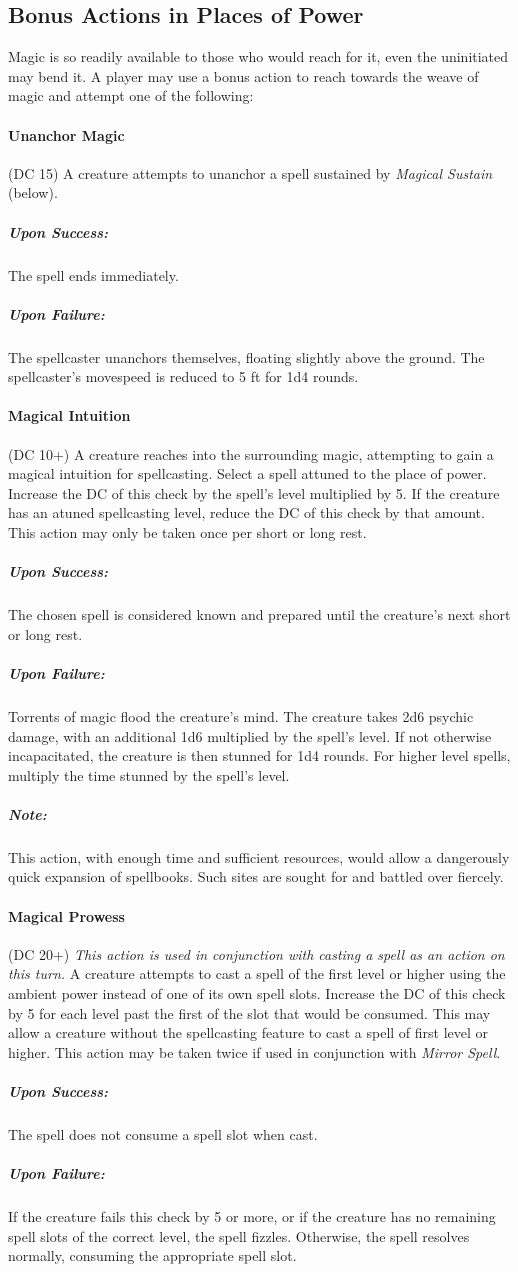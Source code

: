 \documentclass{article}
\newcommand{\action}[2]{\paragraph*{{\color{tan}#1}} (DC #2)\newline}
\newcommand{\success}{\subparagraph*{{\color{tan}Upon Success:}}}
\newcommand{\failure}{\subparagraph*{{\color{tan}Upon Failure:}}}
\newcommand{\note}{\subparagraph*{{\color{tan}Note:}}}
\newcommand{\attuned}{ {\em \color{req} This action is used in conjunction with casting a spell as an action on this turn.} }
\begin{document}
\begin{multicols}{2}
  \section*{Bonus Actions in Places of Power}

  Magic is so readily available to those who would reach for it, even the uninitiated may bend it.
  A player may use a bonus action to reach towards the weave of magic and attempt one of the following:

\action{Unanchor Magic}{15}
  A creature attempts to unanchor a spell sustained by {\it Magical Sustain} (below).
\success
  The spell ends immediately.
\failure
  The spellcaster unanchors themselves, floating slightly above the ground.
  The spellcaster's movespeed is reduced to 5 ft for 1d4 rounds.

\action{Magical Intuition}{10+}
  A creature reaches into the surrounding magic, attempting to gain a magical intuition for spellcasting.
  Select a spell attuned to the place of power.
  Increase the DC of this check by the spell's level multiplied by 5.
  If the creature has an atuned spellcasting level, reduce the DC of this check by that amount.
  This action may only be taken once per short or long rest.
\success
  The chosen spell is considered known and prepared until the creature's next short or long rest.
\failure
  Torrents of magic flood the creature's mind.
  The creature takes 2d6 psychic damage, with an additional 1d6 multiplied by the spell's level.
  If not otherwise incapacitated, the creature is then stunned for 1d4 rounds.
  For higher level spells, multiply the time stunned by the spell's level.
\note
  This action, with enough time and sufficient resources, would allow a dangerously quick expansion of spellbooks.
  Such sites are sought for and battled over fiercely.

\action{Magical Prowess}{20+}
  \attuned
  A creature attempts to cast a spell of the first level or higher using the ambient power instead of one of its own spell slots.
  Increase the DC of this check by 5 for each level past the first of the slot that would be consumed.
  This may allow a creature without the spellcasting feature to cast a spell of first level or higher.
  This action may be taken twice if used in conjunction with {\it Mirror Spell}.
\success
  The spell does not consume a spell slot when cast.
\failure
  If the creature fails this check by 5 or more, or if the creature has no remaining spell slots of the correct level, the spell fizzles.
  Otherwise, the spell resolves normally, consuming the appropriate spell slot.
  

\end{multicols}
\end{document}
